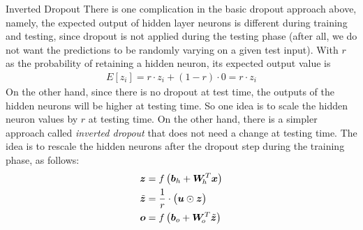 \begin{frame}{Inverted Dropout}
There is one complication in the basic dropout approach above, namely,
the expected output of hidden layer neurons is different during training
and testing, since dropout is not applied during the testing phase 
(after all, we do not want the predictions to be randomly varying on a
given test input). With $r$ as the probability of retaining a
hidden neuron, its expected output value is
\begin{align*}
    E[z_i] = r \cdot z_i + (1-r) \cdot 0 = r \cdot z_i
\end{align*}
On the other hand, since there is no dropout at test time, the outputs
of the hidden neurons will be higher at testing time. So one idea is to
scale the hidden neuron values by $r$ at testing time. On the other
hand, there is a simpler approach called {\em inverted dropout} that
does not need a change at testing time. The idea is to rescale the
hidden neurons after the dropout step during the training phase, as follows:
\begin{align*}
    {\boldsymbol z} & = f\left({\boldsymbol b}_{h} + {\boldsymbol W}_{\!h}^T {\boldsymbol x} \right)\\
    \tilde{{\boldsymbol z}} & = \frac{1}{r} \cdot \bigl({\boldsymbol u} \odot {\boldsymbol z}\bigr)\\
    {\boldsymbol o} & = f\left({\boldsymbol b}_{o} + {\boldsymbol W}_{\!o}^T \tilde{{\boldsymbol z}} \right)
\end{align*}
\end{frame}
%
